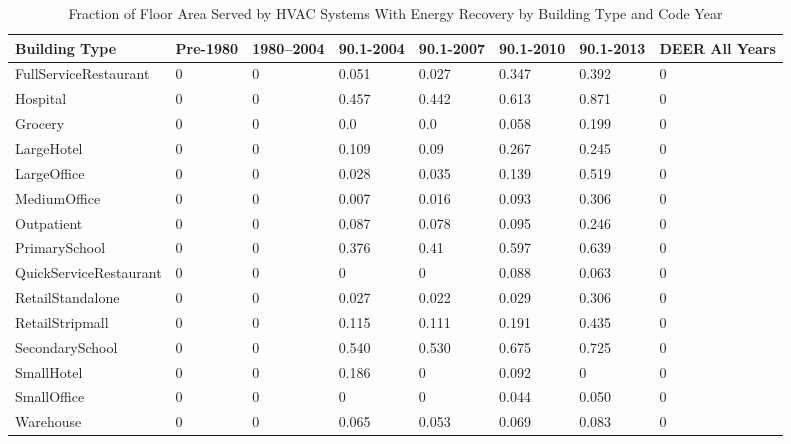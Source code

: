 \begin{table}[h!]
\centering
\scriptsize
\caption[Energy Recovery Prevalence]{Fraction of Floor Area Served by HVAC Systems With Energy Recovery by Building Type and Code Year}
\label{tab:energy_recovery_prev}
\begin{tabular}{|p{2.2cm}|p{0.3in}|p{0.3in}|p{0.3in}|p{0.3in}|p{0.3in}|p{0.3in}|p{0.3in}|}
\hline
\textbf{Building Type} &
  \textbf{Pre-1980} &
  \textbf{1980--2004} &
  \textbf{90.1-2004} &
  \textbf{90.1-2007} &
  \textbf{90.1-2010} &
  \textbf{90.1-2013} &
  \textbf{DEER All Years} \\ \hline
FullService\-Restaurant  & 0 & 0 & 0.051 & 0.027 & 0.347 & 0.392 & 0 \\ \hline
Hospital               & 0 & 0 & 0.457 & 0.442 & 0.613 & 0.871 & 0 \\ \hline
Grocery                & 0 & 0 & 0.0 & 0.0 & 0.058 & 0.199 & 0 \\ \hline
LargeHotel             & 0 & 0 & 0.109 & 0.09  & 0.267 & 0.245 & 0 \\ \hline
LargeOffice            & 0 & 0 & 0.028 & 0.035 & 0.139 & 0.519 & 0 \\ \hline
MediumOffice           & 0 & 0 & 0.007 & 0.016 & 0.093 & 0.306 & 0 \\ \hline
Outpatient             & 0 & 0 & 0.087 & 0.078 & 0.095 & 0.246 & 0 \\ \hline
PrimarySchool          & 0 & 0 & 0.376 & 0.41  & 0.597 & 0.639 & 0 \\ \hline
QuickService\-Restaurant & 0 & 0 & 0     & 0     & 0.088 & 0.063 & 0 \\ \hline
RetailStandalone       & 0 & 0 & 0.027 & 0.022 & 0.029 & 0.306 & 0 \\ \hline
RetailStripmall        & 0 & 0 & 0.115 & 0.111 & 0.191 & 0.435 & 0 \\ \hline
SecondarySchool        & 0 & 0 & 0.540 & 0.530 & 0.675 & 0.725 & 0 \\ \hline
SmallHotel             & 0 & 0 & 0.186 & 0     & 0.092 & 0     & 0 \\ \hline
SmallOffice            & 0 & 0 & 0     & 0     & 0.044 & 0.050 & 0 \\ \hline
Warehouse              & 0 & 0 & 0.065 & 0.053 & 0.069 & 0.083 & 0 \\ \hline
\end{tabular}
\end{table}